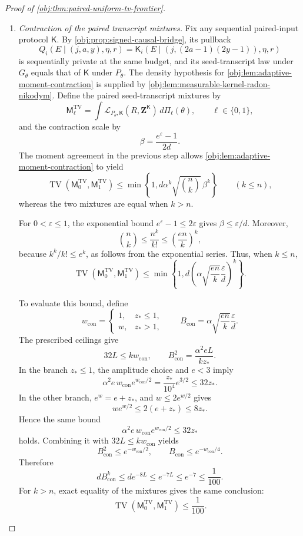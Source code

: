 \begin{proof}[Proof of \cref{obj:thm:paired-uniform-tv-frontier}]
\begin{enumerate}
\item \textit{Contraction of the paired transcript mixtures.}
Fix any sequential paired-input protocol \(\mathsf K\).
By \cref{obj:prop:signed-causal-bridge}, its pullback
\[
Q_i(E\mid(j,a,y),\eta,r)
=
\mathsf K_i\!\left(E\mid(j,(2a-1)(2y-1)),\eta,r\right)
\]
is sequentially private at the same budget, and its seed-transcript law under \(G_\theta\) equals that of \(\mathsf K\) under \(P_\theta\).
The density hypothesis for \cref{obj:lem:adaptive-moment-contraction} is supplied by \cref{obj:lem:measurable-kernel-radon-nikodym}.
Define the paired seed-transcript mixtures by
\[
\mathsf M_\ell^{\mathrm{TV}}
=
\int\mathcal L_{P_\theta,\mathsf K}(R,\mathbf Z^{\mathsf K})\,
d\Pi_\ell(\theta),
\qquad \ell\in\{0,1\},
\]
and the contraction scale by
\[
\beta=\frac{e^\varepsilon-1}{2d}.
\]
The moment agreement in the previous step allows \cref{obj:lem:adaptive-moment-contraction} to yield
\[
\operatorname{TV}(\mathsf M_0^{\mathrm{TV}},\mathsf M_1^{\mathrm{TV}})
\le
\min\left\{1,d\alpha^k\sqrt{\binom nk}\,\beta^k\right\}
\qquad(k\le n),
\]
whereas the two mixtures are equal when \(k>n\).

For \(0<\varepsilon\le1\), the exponential bound
\(e^\varepsilon-1\le2\varepsilon\) gives \(\beta\le\varepsilon/d\).
Moreover,
\[
\binom nk\le\frac{n^k}{k!}\le\left(\frac{en}{k}\right)^k,
\]
because \(k^k/k!\le e^k\), as follows from the exponential series.
Thus, when \(k\le n\),
\[
\operatorname{TV}(\mathsf M_0^{\mathrm{TV}},\mathsf M_1^{\mathrm{TV}})
\le
\min\left\{1,
d\left(\alpha\sqrt{\frac{en}{k}}\frac{\varepsilon}{d}\right)^k
\right\}.
\]

To evaluate this bound, define
\[
w_{\mathrm{con}}=
\begin{cases}
1,&z_*\le1,\\
w,&z_*>1,
\end{cases}
\qquad
B_{\mathrm{con}}=\alpha\sqrt{\frac{en}{k}}\frac{\varepsilon}{d}.
\]
The prescribed ceilings give
\[
32L\le k w_{\mathrm{con}},
\qquad
B_{\mathrm{con}}^2=\frac{\alpha^2eL}{kz_*}.
\]
In the branch \(z_*\le1\), the amplitude choice and \(e<3\) imply
\[
\alpha^2e\,w_{\mathrm{con}}e^{w_{\mathrm{con}}/2}
=\frac{z_*}{10^4}e^{3/2}\le32z_*.
\]
In the other branch, \(e^w=e+z_*\), and \(w\le2e^{w/2}\) gives
\[
w e^{w/2}\le2(e+z_*)\le8z_*.
\]
Hence the same bound
\[
\alpha^2e\,w_{\mathrm{con}}e^{w_{\mathrm{con}}/2}\le32z_*
\]
holds. Combining it with \(32L\le kw_{\mathrm{con}}\) yields
\[
B_{\mathrm{con}}^2\le e^{-w_{\mathrm{con}}/2},
\qquad
B_{\mathrm{con}}\le e^{-w_{\mathrm{con}}/4}.
\]
Therefore
\[
d B_{\mathrm{con}}^k
\le d e^{-8L}
\le e^{-7L}
\le e^{-7}\le\frac1{100}.
\]
For \(k>n\), exact equality of the mixtures gives the same conclusion:
\[
\operatorname{TV}(\mathsf M_0^{\mathrm{TV}},\mathsf M_1^{\mathrm{TV}})
\le\frac1{100}.
\]


\end{enumerate}
\end{proof}
